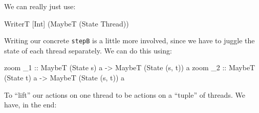 \documentclass[]{article}
\newenvironment{Shaded}{}{}
\newcommand{\CommentTok}[1]{\textcolor[rgb]{0.38,0.63,0.69}{\textit{#1}}}
\newcommand{\DataTypeTok}[1]{\textcolor[rgb]{0.56,0.13,0.00}{#1}}
\newcommand{\FunctionTok}[1]{\textcolor[rgb]{0.02,0.16,0.49}{#1}}
\newcommand{\KeywordTok}[1]{\textcolor[rgb]{0.00,0.44,0.13}{\textbf{#1}}}
\newcommand{\NormalTok}[1]{#1}
\newcommand{\OtherTok}[1]{\textcolor[rgb]{0.00,0.44,0.13}{#1}}
\begin{document}
We can really just use:

\begin{Shaded}
\begin{Highlighting}[]
\DataTypeTok{WriterT}\NormalTok{ [}\DataTypeTok{Int}\NormalTok{] (}\DataTypeTok{MaybeT}\NormalTok{ (}\DataTypeTok{State} \DataTypeTok{Thread}\NormalTok{))}
\end{Highlighting}
\end{Shaded}

Writing our concrete \texttt{stepB} is a little more involved, since we have to
juggle the state of each thread separately. We can do this using:

\begin{Shaded}
\begin{Highlighting}[]
\NormalTok{zoom}\OtherTok{ _1 ::} \DataTypeTok{MaybeT}\NormalTok{ (}\DataTypeTok{State}\NormalTok{ s) a }\OtherTok{->} \DataTypeTok{MaybeT}\NormalTok{ (}\DataTypeTok{State}\NormalTok{ (s, t)) a}
\NormalTok{zoom}\OtherTok{ _2 ::} \DataTypeTok{MaybeT}\NormalTok{ (}\DataTypeTok{State}\NormalTok{ t) a }\OtherTok{->} \DataTypeTok{MaybeT}\NormalTok{ (}\DataTypeTok{State}\NormalTok{ (s, t)) a}
\end{Highlighting}
\end{Shaded}

To ``lift'' our actions on one thread to be actions on a ``tuple'' of threads.
We have, in the end:

\begin{Shaded}
\end{Shaded}
\end{document}
